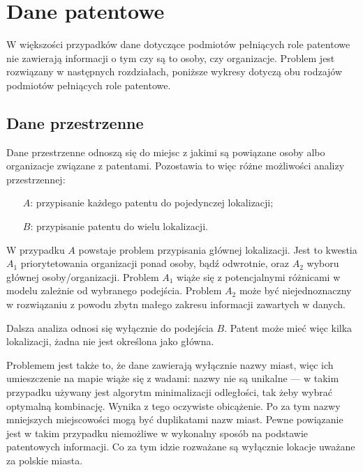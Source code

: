 \section{Dane patentowe}

\begin{uwaga}
W większości przypadków dane dotyczące podmiotów pełniących role patentowe
nie zawierają informacji o tym czy są to osoby, czy organizacje.
Problem jest rozwiązany w następnych rozdziałach, poniższe wykresy
dotyczą obu rodzajów podmiotów pełniących role patentowe.
\end{uwaga}



\subsection{Dane przestrzenne}

Dane przestrzenne odnoszą się do miejsc z jakimi są powiązane
osoby albo organizacje związane z patentami. Pozostawia to więc 
różne możliwości analizy przestrzennej:

\begin{enumerate}
\item[$A$:] przypisanie każdego patentu do pojedynczej lokalizacji;
\item[$B$:] przypisanie patentu do wielu lokalizacji.
\end{enumerate}

W przypadku $A$ powstaje problem przypisania głównej lokalizacji.
Jest to kwestia $A_1$ priorytetowania organizacji ponad osoby, bądź
odwrotnie, oraz $A_2$ wyboru głównej osoby/organizacji.
Problem $A_1$ wiąże się z potencjalnymi różnicami w modelu zależnie
od wybranego podejścia. Problem $A_2$ może być niejednoznaczny
w rozwiązaniu z powodu zbytn małego zakresu informacji zawartych w danych.

Dalsza analiza odnosi się wyłącznie do podejścia $B$.
Patent może mieć więc kilka lokalizacji, żadna nie jest określona jako główna.

Problemem jest także to, że dane zawierają wyłącznie nazwy miast, 
więc ich umieszczenie na mapie wiąże się z wadami: 
nazwy nie są unikalne --- w takim przypadku używany jest algorytm minimalizacji 
odległości, tak żeby wybrać optymalną kombinację. 
Wynika z tego oczywiste obicążenie. 
Po za tym nazwy mniejszych miejscowości mogą być duplikatami
nazw miast. Pewne powiązanie jest w takim przypadku niemożliwe
w wykonalny sposób na podstawie patentowych informacji.
Co za tym idzie rozważane są wyłącznie lokacje uważane za polskie miasta.



